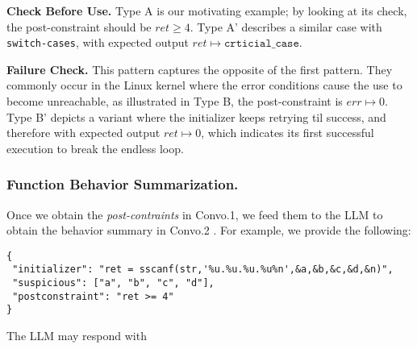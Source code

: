 \squishlist
\item \textbf{Check Before Use.} 
Type A is our motivating example; by looking at its check, the post-constraint should be \(ret \ge 4\).
Type A' describes a similar case with \texttt{switch-cases}, with expected output \(ret \mapsto \texttt{crticial\_case}\).
\item \textbf{Failure Check.} This pattern captures the opposite of the first pattern. They commonly occur in the Linux kernel where the error conditions cause the use to become unreachable, as illustrated in Type B, the post-constraint is \(err \mapsto 0\).
Type B' depicts a variant where the initializer keeps retrying til success, and therefore with expected output \(ret \mapsto 0\), which indicates
its first successful execution to break the endless loop.
\squishend


\subsubsection{Function Behavior Summarization.} 
Once we obtain the \textit{post-contraints} in Convo.1, we feed them to the LLM to obtain the behavior summary in Convo.2 . For example, we provide the following: 

\begin{lstlisting}[numbers=none]
{
 "initializer": "ret = sscanf(str,'%u.%u.%u.%u%n',&a,&b,&c,&d,&n)",
 "suspicious": ["a", "b", "c", "d"],
 "postconstraint": "ret >= 4"
}
\end{lstlisting}


The LLM may respond with 

